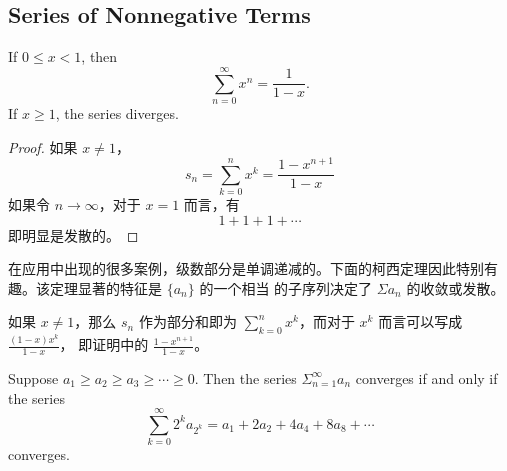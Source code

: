 \documentclass[../poma-notes.tex]{subfiles}
\begin{document}
\subsection*{Series of Nonnegative Terms}

\begin{theorem}
  If $0 \le x < 1$, then
  \[ \sum_{n=0}^{\infty} x^n = \frac{1}{1-x}. \]
  If $x \ge 1$, the series diverges.
\end{theorem}

\begin{proof}
  如果 $x \ne 1$，
  \[ s_n = \sum_{k=0}^{n} x^k = \frac{1-x^{n+1}}{1-x} \]
  如果令 $n \to \infty$，对于 $x=1$ 而言，有
  \[ 1 + 1 + 1 + \cdots \]
  即明显是发散的。
\end{proof}

在应用中出现的很多案例，级数部分是单调递减的。下面的柯西定理因此特别有趣。该定理显著的特征是 $\{a_n\}$ 的一个相当  的子序列决定了 $\Sigma a_n$
的收敛或发散。

\begin{anote}
  如果 $x \ne 1$，那么 $s_n$ 作为部分和即为 $\sum_{k=0}^{n} x^k$，而对于 $x^k$ 而言可以写成 $\frac{(1-x)x^k}{1-x}$，
  即证明中的 $\frac{1-x^{n+1}}{1-x}$。
\end{anote}

\begin{theorem}
  Suppose $a_1 \ge a_2 \ge a_3 \ge \cdots \ge 0$. Then the series $\Sigma_{n=1}^{\infty} a_n$ converges if and only if the series
  \begin{equation}
    \sum_{k=0}^{\infty} 2^k a_{2^k} = a_1 + 2a_2 + 4a_4 + 8a_8 + \cdots
  \end{equation}
  converges.
\end{theorem}
\end{document}
